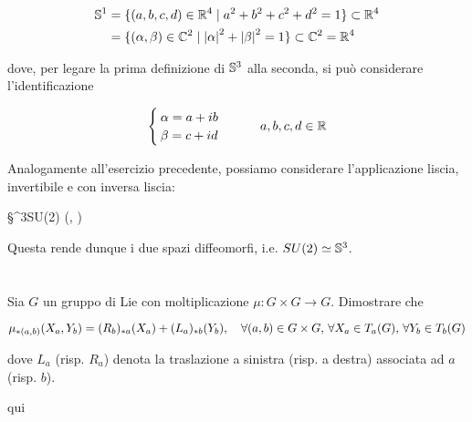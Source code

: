 \begin{align}
	\begin{split}
		\S^{1} &= \{ (a,b,c,d) \in \R^{4} \mid a^{2} + b^{2} + c^{2} + d^{2} = 1 \} \subset \R^{4} \\
		&= \{ (\alpha, \beta) \in \C^{2} \mid \abs{\alpha}^{2} + \abs{\beta}^{2} = 1 \} \subset \C^{2} = \R^{4}
	\end{split}
\end{align}

dove, per legare la prima definizione di $ \S^{3} $ alla seconda, si può considerare l'identificazione

\begin{equation}
	\begin{cases}
		\alpha = a + i b \\
		\beta = c + i d
	\end{cases} %
	\qquad a,b,c,d \in \R
\end{equation}

Analogamente all'esercizio precedente, possiamo considerare l'applicazione liscia, invertibile e con inversa liscia:

\map{\phi}
	{\S^{3}}{SU(2)}
	{(\alpha, \beta)}{\bmqty{ \alpha & - \bar{\beta} \\ \beta & \bar{\alpha} }}

Questa rende dunque i due spazi diffeomorfi, i.e. $ SU(2) \simeq \S^{3} $.

%

\newpage

%

\section{}\label{es3-7}

\begin{tcolorbox}
	Sia $ G $ un gruppo di Lie con moltiplicazione $ \mu : G \times G \to G $. Dimostrare che
	
	\begin{equation}
		\mu_{*(a,b)}(X_{a},Y_{b}) = (R_{b})_{*a}(X_{a}) + (L_{a})_{*b}(Y_{b}) \qcomma \forall (a,b) \in G \times G, \, \forall X_{a} \in T_{a}(G), \, \forall Y_{b} \in T_{b}(G)
	\end{equation}
	
	dove $ L_{a} $ (risp. $ R_{a} $) denota la traslazione a sinistra (risp. a destra) associata ad $ a $ (risp. $ b $).
\end{tcolorbox}

qui

